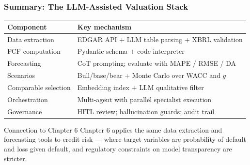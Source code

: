 \documentclass[9pt,t]{beamer}
\begin{document}
\begin{frame}
\frametitle{Summary: The LLM-Assisted Valuation Stack}

\begin{center}
\begin{tabular}{ll}
\toprule
\textbf{Component} & \textbf{Key mechanism} \\
\midrule
Data extraction & EDGAR API + LLM table parsing + XBRL validation \\
FCF computation & Pydantic schema + code interpreter \\
Forecasting & CoT prompting; evaluate with MAPE / RMSE / DA \\
Scenarios & Bull/base/bear + Monte Carlo over WACC and $g$ \\
Comparable selection & Embedding index + LLM qualitative filter \\
Orchestration & Multi-agent with parallel specialist execution \\
Governance & HITL review; hallucination guards; audit trail \\
\bottomrule
\end{tabular}
\end{center}

\medskip
\begin{block}{Connection to Chapter 6}
Chapter 6 applies the same data extraction and forecasting tools to credit risk ---
where target variables are probability of default and loss given default, and regulatory
constraints on model transparency are stricter.
\end{block}
\end{frame}

\end{document}
